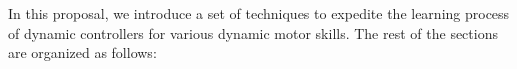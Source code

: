 
In this proposal, we introduce a set of techniques to expedite
the learning process of dynamic controllers for various dynamic motor 
skills. 
The rest of the sections are organized as follows:


